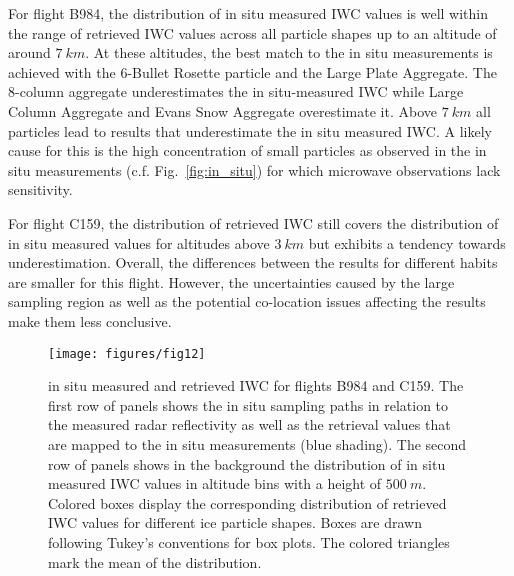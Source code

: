 \documentclass[journal abbreviation, manuscript]{copernicus}
\begin{document}
For flight B984, the distribution of in situ measured IWC values is well within
the range of retrieved IWC values across all particle shapes up to an altitude
of around $7\ \unit{km}$. At these altitudes, the best match to the in situ
measurements is achieved with the 6-Bullet Rosette particle and the Large Plate
Aggregate. The 8-column aggregate underestimates the in situ-measured IWC while
Large Column Aggregate and Evans Snow Aggregate overestimate it. Above
$7\ \unit{km}$ all particles lead to results that underestimate the
in situ measured IWC. A likely cause for this is the high concentration of
small particles as observed in the in situ measurements (c.f.
Fig.~\ref{fig:in_situ}) for which microwave observations lack
sensitivity.

For flight C159, the distribution of retrieved IWC still covers the distribution
of in situ measured values for altitudes above $3\ \unit{km}$ but exhibits a
tendency towards underestimation. Overall, the differences between the results
for different habits are smaller for this flight. However, the uncertainties
caused by the large sampling region as well as the potential co-location issues
affecting the results make them less conclusive.

\begin{figure}[!hbpt]
  \centering
  \texttt{[image: figures/fig12]}
  \caption{in situ measured and retrieved IWC for flights B984 and C159. The
    first row of panels shows the in situ sampling paths in relation to the
    measured radar reflectivity as well as the retrieval values that are mapped
    to the in situ measurements (blue shading). The second row of panels shows
    in the background the distribution of in situ measured IWC values in
    altitude bins with a height of $500\ \unit{m}$. Colored boxes display the
    corresponding distribution of retrieved IWC values for different ice
    particle shapes. Boxes are drawn following Tukey's conventions for box
    plots. The colored triangles mark the mean of the distribution.}
  \label{fig:in_situ_iwc}
\end{figure}
\end{document}
